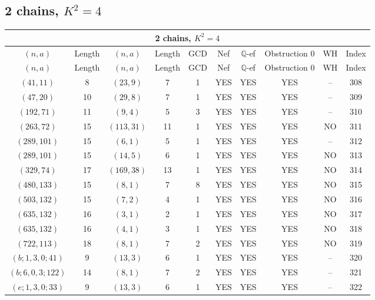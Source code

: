 \subsection{2 chains, $K^2 = 4$}
\begin{longtable}{|c|c|c|c|c|c|c|c|c|c|}
\hline
\multicolumn{10}{|c|}{2 chains, $K^2 = 4$}\\
\hline
$(n,a)$ & Length & $(n,a)$ & Length & GCD & Nef & $\mathbb Q$-ef & Obstruction 0 & WH & Index\\
\hline
\endfirsthead

\hline
$(n,a)$ & Length & $(n,a)$ & Length & GCD & Nef & $\mathbb Q$-ef & Obstruction 0 & WH & Index\\
\hline
\endhead
\hline
\endfoot

$(41, 11)$ & 8 & $(23, 9)$ & 7 & 1 & YES & YES & YES & -- & 308\\
$(47, 20)$ & 10 & $(29, 8)$ & 7 & 1 & YES & YES & YES & -- & 309\\
$(192, 71)$ & 11 & $(9, 4)$ & 5 & 3 & YES & YES & YES & -- & 310\\
$(263, 72)$ & 15 & $(113, 31)$ & 11 & 1 & YES & YES & YES & NO & 311\\
$(289, 101)$ & 15 & $(6, 1)$ & 5 & 1 & YES & YES & YES & -- & 312\\
$(289, 101)$ & 15 & $(14, 5)$ & 6 & 1 & YES & YES & YES & NO & 313\\
$(329, 74)$ & 17 & $(169, 38)$ & 13 & 1 & YES & YES & YES & NO & 314\\
$(480, 133)$ & 15 & $(8, 1)$ & 7 & 8 & YES & YES & YES & NO & 315\\
$(503, 132)$ & 15 & $(7, 2)$ & 4 & 1 & YES & YES & YES & NO & 316\\
$(635, 132)$ & 16 & $(3, 1)$ & 2 & 1 & YES & YES & YES & NO & 317\\
$(635, 132)$ & 16 & $(4, 1)$ & 3 & 1 & YES & YES & YES & NO & 318\\
$(722, 113)$ & 18 & $(8, 1)$ & 7 & 2 & YES & YES & YES & NO & 319\\
$(b; 1, 3, 0; 41)$ & 9 & $(13, 3)$ & 6 & 1 & YES & YES & YES & -- & 320\\
$(b; 6, 0, 3; 122)$ & 14 & $(8, 1)$ & 7 & 2 & YES & YES & YES & -- & 321\\
$(e; 1, 3, 0; 33)$ & 9 & $(13, 3)$ & 6 & 1 & YES & YES & YES & -- & 322
\end{longtable}

